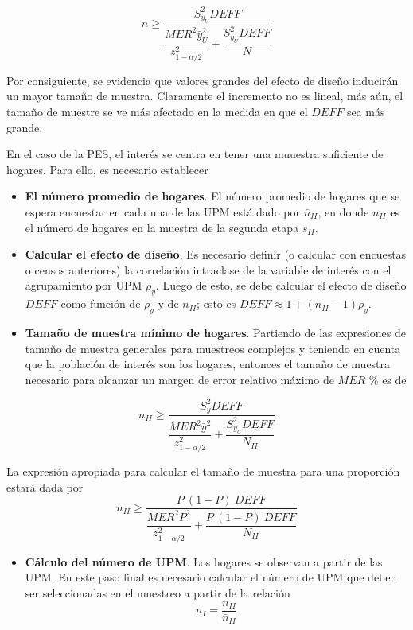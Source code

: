 \documentclass[
  12pt,
]{book}
\providecommand{\tightlist}{%
  \setlength{\itemsep}{0pt}\setlength{\parskip}{0pt}}
\begin{document}
\[
n \geq \dfrac{S^2_{y_U}DEFF}{\dfrac{MER^2 \bar{y}_U^2}{z_{1-\alpha/2}^2}+\dfrac{S^2_{y_U}DEFF}{N}}
\]

Por consiguiente, se evidencia que valores grandes del efecto de diseño inducirán un mayor tamaño de muestra. Claramente el incremento no es lineal, más aún, el tamaño de muestre se ve más afectado en la medida en que el \(DEFF\) sea más grande.

En el caso de la PES, el interés se centra en tener una muuestra suficiente de hogares. Para ello, es necesario establecer

\begin{itemize}
\item
  \textbf{El número promedio de hogares}. El número promedio de hogares que se espera encuestar en cada una de las UPM está dado por \(\bar{n}_{II}\), en donde \(n_{II}\) es el número de hogares en la muestra de la segunda etapa \(s_{II}\).
\item
  \textbf{Calcular el efecto de diseño}. Es necesario definir (o calcular con encuestas o censos anteriores) la correlación intraclase de la variable de interés con el agrupamiento por UPM \(\rho_y\). Luego de esto, se debe calcular el efecto de diseño \(DEFF\) como función de \(\rho_y\) y de \(\bar{n}_{II}\); esto es \(DEFF \approx 1 + (\bar{n}_{II} - 1)\rho_y\).
\item
  \textbf{Tamaño de muestra mínimo de hogares}. Partiendo de las expresiones de tamaño de muestra generales para muestreos complejos y teniendo en cuenta que la población de interés son los hogares, entonces el tamaño de muestra necesario para alcanzar un margen de error relativo máximo de \(MER\) \% es de
\end{itemize}

\[
n_{II} \geq \dfrac{S^2_{y}DEFF}{\dfrac{MER^2 \bar{y}^2}{z_{1-\alpha/2}^2}+\dfrac{S^2_{y_U}DEFF}{N_{II}}}
\]

La expresión apropiada para calcular el tamaño de muestra para una proporción estará dada por
\[
n_{II} \geq \dfrac{P\ (1-P)\ DEFF}{\dfrac{MER^2P^2}{z_{1-\alpha/2}^2}+\dfrac{P\ (1-P) \ DEFF}{N_{II}}}
\]

\begin{itemize}
\tightlist
\item
  \textbf{Cálculo del número de UPM}. Los hogares se observan a partir de las UPM. En este paso final es necesario calcular el número de UPM que deben ser seleccionadas en el muestreo a partir de la relación
  \[
  n_{I} = \frac{n_{II}}{\bar{n}_{II}}
  \]
\end{itemize}
\end{document}
